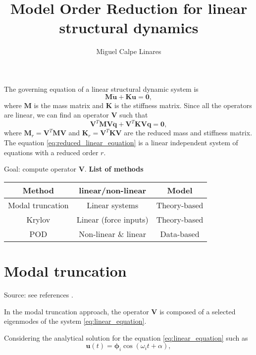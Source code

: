 \documentclass{article}
\title{Model Order Reduction for linear structural dynamics}
\author{Miguel Calpe Linares}
\date{}
\begin{document}
\maketitle

The governing equation of a linear structural dynamic system is
\begin{equation}
    \bm{M}\bm{\ddot{u}} + \bm{K}\bm{u} = \bm{0},
    \label{eq:linear_equation}
\end{equation}
where $\bm{M}$ is the mass matrix and $\bm{K}$ is the stiffness matrix. Since all 
the operators are linear, we can find an operator $\bm{V}$ such that 
\begin{equation}
    \bm{V}^T\bm{M}\bm{V}\bm{\ddot{q}} + \bm{V}^T\bm{K}\bm{V}\bm{q} = \bm{0},
    \label{eq:reduced_linear_equation}
\end{equation}
where $\bm{M}_r=\bm{V}^T\bm{M}\bm{V}$ and $\bm{K}_r=\bm{V}^T\bm{K}\bm{V}$ are the reduced mass and 
stiffness matrix. The equation \ref{eq:reduced_linear_equation} is a linear independent 
system of equations with a reduced order $r$.\newline

Goal: compute operator $\bm{V}$.\newline
\textbf{List of methods}

\begin{center}
  \begin{tabular}{||c c c ||} 
  \hline
  Method & linear/non-linear & Model \\ [0.5ex] 
  \hline\hline
  Modal truncation & Linear systems & Theory-based \\ 
  \hline
  Krylov & Linear (force inputs) & Theory-based \\ 
  \hline
  POD & Non-linear \& linear & Data-based \\ 
  \hline
 \end{tabular}
 \end{center}

\section{Modal truncation}
Source: see references \cite{rutzmoser18}. \newline 

In the modal truncation approach, the operator $\bm{V}$ is composed of a selected  
eigenmodes of the system \ref{eq:linear_equation}.\newline

Considering the analytical solution for the equation \ref{eq:linear_equation} such as
\begin{equation}
    \bm{u}(t) = \bm{\phi}_i \cos (\omega_it + \alpha),
\end{equation}
\end{document}
